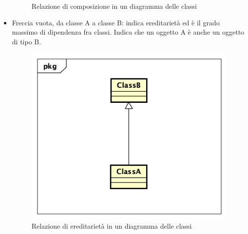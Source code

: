 \begin{itemize}
\begin{figure}[h]
		\caption{Relazione di composizione in un diagramma delle classi}\label{}
	\end{figure}
	\item Freccia vuota, da classe A a classe B: indica ereditarietà ed è il grado massimo di dipendenza fra classi. Indica che un oggetto A è anche un oggetto di tipo B.
	\begin{figure}[h]
		\centering
		\includegraphics[scale=0.5]{images/Ereditarieta.png}
		\caption{Relazione di ereditarietà in un diagramma delle classi}\label{}
	\end{figure}
\end{itemize}



